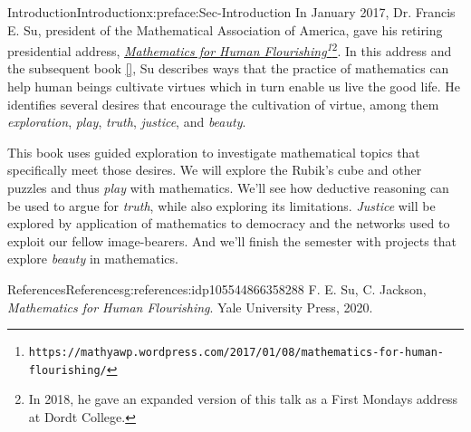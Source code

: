 \documentclass[oneside,10pt,]{book}
\newcommand{\xreffont}{\relax}
\numberwithin{equation}{section}
\begin{document}
\null\clearpage
%
%
\typeout{************************************************}
\typeout{************************************************}
%
\begin{preface}{Introduction}{}{Introduction}{}{}{x:preface:Sec-Introduction}
In January 2017, Dr. Francis E. Su, president of the Mathematical Association of America, gave his retiring presidential address, \emph{\href{https://mathyawp.wordpress.com/2017/01/08/mathematics-for-human-flourishing/}{Mathematics for Human Flourishing}\footnote{\nolinkurl{https://mathyawp.wordpress.com/2017/01/08/mathematics-for-human-flourishing/}\label{g:fn:idp105544866371984}}}\footnote{In 2018, he gave an expanded version of this talk as a First Mondays address at Dordt College.\label{g:fn:idp105544866376336}}. In this address and the subsequent book \hyperlink{x:biblio:Su2020}{[{\xreffont 1}]}, Su describes ways that the practice of mathematics can help human beings cultivate virtues which in turn enable us live the good life. He identifies several desires that encourage the cultivation of virtue, among them \emph{exploration}, \emph{play}, \emph{truth}, \emph{justice}, and \emph{beauty}.%
\par
This book uses guided exploration to investigate mathematical topics that specifically meet those desires. We will explore the Rubik's cube and other puzzles and thus \emph{play} with mathematics. We'll see how deductive reasoning can be used to argue for \emph{truth}, while also exploring its limitations. \emph{Justice} will be explored by application of mathematics to democracy and the networks used to exploit our fellow image-bearers. And we'll finish the semester with projects that explore \emph{beauty} in mathematics.%
%
%
\typeout{************************************************}
\typeout{************************************************}
%
\begin{references--numberless}{References}{}{References}{}{}{g:references:idp105544866358288}
F. E. Su, C. Jackson, \emph{Mathematics for Human Flourishing}. Yale University Press, 2020.\end{references--numberless}
\end{preface}
%
%
\typeout{************************************************}
\typeout{************************************************}
%
\end{document}
